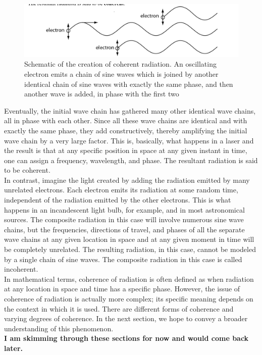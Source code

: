 \documentclass[10pt]{report}
\begin{document}
\begin{figure}\label{figele}
\includegraphics[width=\linewidth]{figele.png}
\caption{Schematic of the creation of coherent radiation.  An oscillating electron emits a chain of sine waves which is joined by another identical chain of sine waves with exactly the same phase, and then another wave is added, in phase with the first two}
\end{figure}
 Eventually, the initial wave chain has gathered many other identical wave chains, all in phase with each other.  Since all these wave chains are identical and with exactly the same phase, they add constructively, thereby amplifying the initial wave chain by a very large factor.  This is, basically, what happens in a laser and the result is that at any specific position in space at any given instant in time, one can assign a frequency, wavelength, and phase.  The resultant radiation is said to be coherent.   \\
In contrast, imagine the light created by adding the radiation emitted by many unrelated electrons. Each electron emits its radiation at some random time, independent of the radiation emitted by the other electrons.  This is what happens in an incandescent light bulb, for example, and in most astronomical sources.  The composite radiation in this case will involve numerous sine wave chains, but the frequencies, directions of travel, and phases of all the separate wave chains at any given location in space and at any given moment in time will be completely unrelated.  The resulting radiation, in this case, cannot be modeled by a single chain of sine waves.  The composite radiation in this case is called incoherent. \\
In mathematical terms, coherence of radiation is often defined as when radiation at any location in space and time has a specific phase.  However, the issue of coherence of radiation is actually more complex; its specific meaning depends on the context in which it is used.  There are different forms of coherence and varying degrees of coherence.  In the next section, we hope to convey a broader understanding of this phenomenon. \\
\textbf{I am skimming through these sections for now and would come back later.}\\
\end{document}
